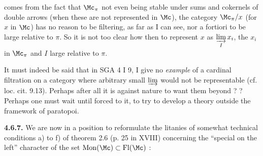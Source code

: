 
comes from the fact that $\Mc_{\pi}$ not even being stable under sums and cokernels of double arrows (when these are not represented in $\Mc$), the category $\Mc_{\pi}/x$ (for $x$ in $\Mc$) has no reason to be filtering, as far as I can see, nor a fortiori
to be large relative to $\pi$. So it is not too clear how then to represent $x$ as $\varinjlim\limits_{I} x_i$, the $x_i$ in $\Mc_{\pi}$ and $I$ large relative to $\pi$.

It must indeed be said that in SGA 4 I 9, I give no \textit{example} of a cardinal filtration on a category where arbitrary small $\varinjlim$ would not be representable (cf. loc. cit. 9.13). Perhaps after all it is against nature to want them beyond ? ? Perhaps one must wait until forced to it, to try to develop a theory outside the framework of paratopoi.


\textbf{4.6.7.} We are now in a position to reformulate the litanies of somewhat technical conditions a) to f) of theorem 2.6 (p. 25 in XVIII) concerning the ``special on the left'' character of the set $\mathrm{Mon}(\Mc) \subset \mathrm{Fl}(\Mc)$ :

